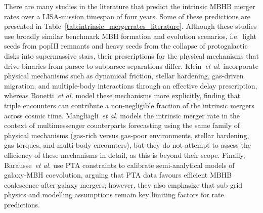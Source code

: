\documentclass[a4paper,12pt]{article}
\begin{document}
There are many studies in the literature that predict the intrinsic MBHB merger rates over a LISA-mission timespan of four years. Some of these predictions are presented in Table~\ref{tab:intrinsic_mergerrates_literature}. Although these studies use broadly similar benchmark MBH formation and evolution scenarios, i.e.\ light seeds from popIII remnants and heavy seeds from the collapse of protogalactic disks into supermassive stars, their prescriptions for the physical mechanisms that drive binaries from parsec to subparsec separations differ. Klein~\textit{et al.}\cite{klein2016science} incorporate physical mechanisms such as dynamical friction, stellar hardening, gas-driven migration, and multiple-body interactions through an effective delay prescription, whereas Bonetti~\textit{et al.}\cite{bonetti2019post} model these mechanisms more explicitly, finding that triple encounters can contribute a non-negligible fraction of the intrinsic mergers across cosmic time. Mangliagli~\textit{et al.}\cite{mangiagli2022massive} models the intrinsic merger rate in the context of multimessenger counterparts forecasting using the same family of physical mechanisms (gas-rich versus gas-poor environments, stellar hardening, gas torques, and multi-body encounters), but they do not attempt to assess the efficiency of these mechanisms in detail, as this is beyond their scope. Finally, Barausse~\textit{et al.}\cite{barausse2023implications} use PTA constraints to calibrate semi-analytical models of galaxy-MBH coevolution, arguing that PTA data favours efficient MBHB coalescence after galaxy mergers; however, they also emphasize that sub-grid physics and modelling assumptions remain key limiting factors for rate predictions. 
\\
\end{document}
